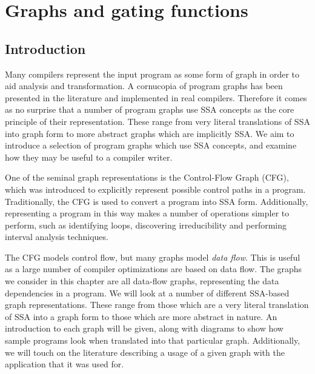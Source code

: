 \chapter{Graphs and gating functions }
\label{chapter:vsdg}


\newcommand{\Gn}{$\gamma$-node}
\newcommand{\Gns}{$\gamma$-nodes}
\newcommand{\Tn}{$\theta$-node}
\newcommand{\Tns}{$\theta$-nodes}
\newcommand{\Ttns}{$\theta^{\mathit{tail}}$-nodes}
\newcommand{\triVM}{\textit{tri}VM}

\newcommand{\instruction}[1]{\texttt{#1}}
\newcommand{\register}[1]{\texttt{v#1}}

\section{Introduction}
Many compilers represent the input program as some form of graph in order to aid analysis and transformation. 
A cornucopia of program graphs has been presented in the literature and implemented in real compilers. 
Therefore it comes as no surprise that a number of program graphs use SSA concepts as the core principle of their representation. 
These range from very literal translations of SSA into graph form to more abstract graphs which are implicitly SSA. 
We aim to introduce a selection of program graphs which use SSA concepts, and examine how they may be useful to a compiler writer.

One of the seminal graph representations is the Control-Flow Graph (CFG), which was introduced to explicitly represent possible control paths in a program. 
Traditionally, the CFG is used to convert a program into SSA form. 
Additionally, representing a program in this way makes a number of operations simpler to perform, such as identifying loops, discovering irreducibility and performing interval analysis techniques.

The CFG models control flow, but many graphs model \textit{data flow}. 
This is useful as a large number of compiler optimizations are based on data flow. 
The graphs we consider in this chapter are all data-flow graphs, representing the data dependencies in a program. 
We will look at a number of different SSA-based graph representations. 
These range from those which are a very literal translation of SSA into a graph form to those which are more abstract in nature. 
An introduction to each graph will be given, along with diagrams to show how sample programs look when translated into that particular graph. 
Additionally, we will touch on the literature describing a usage of a given graph with the application that it was used for.

